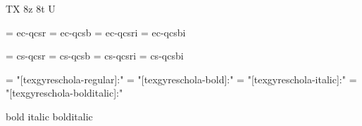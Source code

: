 
\ifx\ffdecl\undefined  \fi

\ffdecl [TG Schola] {\rm \bf \it \bi} {\caps} {} {TX} {8z 8t U}

\def\caps{\ffsetV{caps}{-sc}\ffsetX}  \def\nocaps{\ffsetV{caps}{}\ffsetX}
\def\capsV{} 

\ismacro{}\ifttrue

   \font\tenrm = ec-qcsr  \sizespec
   \font\tenbf = ec-qcsb  \sizespec
   \font\tenit = ec-qcsri \sizespec
   \font\tenbi = ec-qcsbi \sizespec

   \def\ffnamegen{ec-qcs\ffvarV\capsV}

\fi

\ismacro{}\iftrue

   \font\tenrm = cs-qcsr  \sizespec
   \font\tenbf = cs-qcsb  \sizespec
   \font\tenit = cs-qcsri \sizespec
   \font\tenbi = cs-qcsbi \sizespec

   \def\ffnamegen{cs-qcs\ffvarV\capsV}
   

\fi

\ismacro{}\iftrue

   \font\tenrm = "[texgyreschola-regular]:\fontfeatures"    \sizespec
   \font\tenbf = "[texgyreschola-bold]:\fontfeatures"       \sizespec
   \font\tenit = "[texgyreschola-italic]:\fontfeatures"     \sizespec
   \font\tenbi = "[texgyreschola-bolditalic]:\fontfeatures" \sizespec

   \def\ffnamegen{"[texgyreschola-\ffvarV]:\capsV\fontfeatures"} 

    {bold} {italic} {bolditalic}
   \def\caps{\ffsetV{caps}{+smcp;}\ffsetX}

\fi
\tenrm %

\ifx\loadmathfonts\relax \endinput \fi
\ifx\mathpreloaded X\else  \fi                     

\endinput
